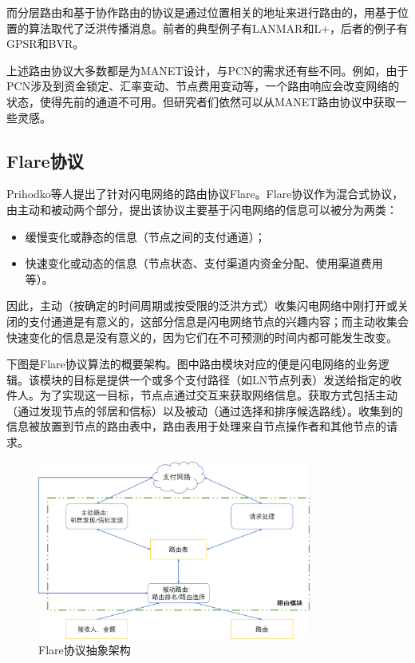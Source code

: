 \documentclass[12pt,a4paper]{article}
\begin{document}
而分层路由和基于协作路由的协议是通过位置相关的地址来进行路由的，用基于位置的算法取代了泛洪传播消息。前者的典型例子有LANMAR\cite{Guangyu}和L+\cite{mitton2005distributed}，后者的例子有GPSR\cite{Karp2000}和BVR\cite{fonseca2005beacon}。

上述路由协议大多数都是为MANET设计，与PCN的需求还有些不同。例如，由于PCN涉及到资金锁定、汇率变动、节点费用变动等，一个路由响应会改变网络的状态，使得先前的通道不可用。但研究者们依然可以从MANET路由协议中获取一些灵感。

\subsection{Flare协议}
Prihodko等人提出了针对闪电网络的路由协议Flare\cite{prihodko2016flare}。Flare协议作为混合式协议，由主动和被动两个部分，提出该协议主要基于闪电网络的信息可以被分为两类：
\begin{itemize}
	\item 缓慢变化或静态的信息（节点之间的支付通道）；
	\item 快速变化或动态的信息（节点状态、支付渠道内资金分配、使用渠道费用等）。
\end{itemize}

因此，主动（按确定的时间周期或按受限的泛洪方式）收集闪电网络中刚打开或关闭的支付通道是有意义的，这部分信息是闪电网络节点的兴趣内容；而主动收集会快速变化的信息是没有意义的，因为它们在不可预测的时间内都可能发生改变。

下图是Flare协议算法的概要架构。图中路由模块对应的便是闪电网络的业务逻辑。该模块的目标是提供一个或多个支付路径（如LN节点列表）发送给指定的收件人。为了实现这一目标，节点点通过交互来获取网络信息。获取方式包括主动（通过发现节点的邻居和信标）以及被动（通过选择和排序候选路线）。收集到的信息被放置到节点的路由表中，路由表用于处理来自节点操作者和其他节点的请求。

\begin{figure}[htb]
\centering
\includegraphics[width=9cm]{high_level_flare}
\caption{Flare协议抽象架构}
\end{figure}
\end{document}
